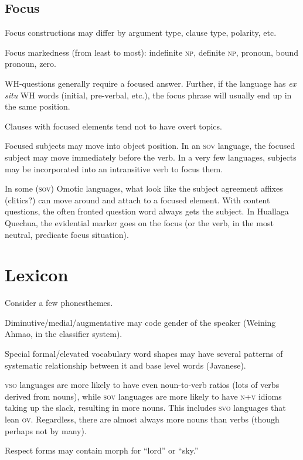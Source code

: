 \documentclass[11pt]{article}
\newcommand{\I}[1]{\textsc{#1}}   %
\begin{document}
\subsection{Focus}
Focus constructions may differ by argument type, clause type,
polarity, etc.

Focus markedness (from least to most): indefinite \I{np}, definite
\I{np}, pronoun, bound pronoun, zero.

WH-questions generally require a focused answer.  Further, if the
language has \textit{ex situ} WH words (initial, pre-verbal, etc.),
the focus phrase will usually end up in the same position.

Clauses with focused elements tend not to have overt topics.

Focused subjects may move into object position. In an \I{sov}
language, the focused subject may move immediately before the verb.
In a very few languages, subjects may be incorporated into an
intransitive verb to focus them.

In some (\I{sov}) Omotic languages, what look like the subject
agreement affixes (clitics?) can move around and attach to a focused
element.  With content questions, the often fronted question word
always gets the subject.  In Huallaga Quechua, the evidential marker
goes on the focus (or the verb, in the most neutral, predicate focus
situation).


\section{Lexicon}
Consider a few phonesthemes.

Diminutive/medial/augmentative may code gender of the speaker (Weining
Ahmao, in the classifier system).

Special formal/elevated vocabulary word shapes may have several
patterns of systematic relationship between it and base level words
(Javanese).

\I{vso} languages are more likely to have even noun-to-verb ratios
(lots of verbs derived from nouns), while \I{sov} languages are more
likely to have \I{n+v} idioms taking up the slack, resulting in more
nouns.  This includes \I{svo} languages that lean \I{ov}.  Regardless,
there are almost always more nouns than verbs (though perhaps not by
many).

Respect forms may contain morph for ``lord'' or ``sky.''
\end{document}
